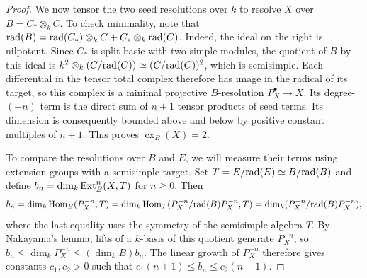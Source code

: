 \documentclass[11pt]{article}
\begin{document}
\begin{proof}
We now tensor the two seed resolutions over $k$ to resolve $X$ over
$B=C_*\otimes_kC$. To check minimality, note that ${\rm rad}(B)={\rm rad}(C_*)\otimes_kC+C_*\otimes_k{\rm rad}(C)$.
Indeed, the ideal on the right is nilpotent.
Since $C_*$ is split basic with two simple modules, the quotient of $B$ by this ideal is
$k^2\otimes_k(C/{\rm rad}(C))\simeq(C/{\rm rad}(C))^2$, which is semisimple.
Each differential in the tensor total complex therefore has image
in the radical of its target, so this complex is a minimal
projective $B$-resolution $P_X^\bullet\to X$.
Its degree-$(-n)$ term is the direct sum of $n+1$ tensor products
of seed terms. Its dimension is consequently bounded above and
below by positive constant multiples of $n+1$. This proves
$\operatorname{cx}_B(X)=2$.

To compare the resolutions over $B$ and $E$, we will measure their
terms using extension groups with a semisimple target. Set
$T=E/{\rm rad}(E)\simeq B/{\rm rad}(B)$ and define
$b_n=\dim_k{\rm Ext}_B^n(X,T)$ for $n\ge0$.
Then $$b_n=\dim_k{\rm Hom}_B(P_X^{-n},T)=\dim_k{\rm Hom}_T(P_X^{-n}/{\rm rad}(B)P_X^{-n},T)=\dim_k(P_X^{-n}/{\rm rad}(B)P_X^{-n}),$$
where the last equality uses the symmetry of the semisimple algebra $T$. By Nakayama's lemma, lifts of a $k$-basis of this quotient generate $P_X^{-n}$, so $b_n\le\dim_kP_X^{-n}\le(\dim_kB)b_n$.
The linear growth of $P_X^{-n}$ therefore gives constants
$c_1,c_2>0$ such that $c_1(n+1)\le b_n\le c_2(n+1)$.


\end{proof}
\end{document}
